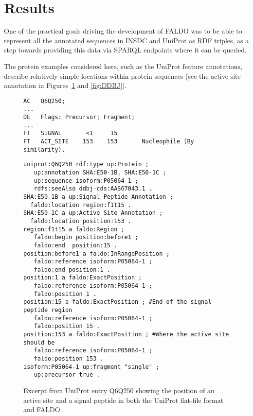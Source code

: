 \section*{Results}
One of the practical goals driving the development of FALDO was to be able
to represent all the annotated sequences in INSDC and UniProt as RDF
triples, as a step towards providing this data via SPARQL endpoints where
it can be queried.

The protein examples considered here, such as the UniProt feature annotations,
describe relatively simple locations within protein sequences
(see the active site annotation in Figures~\ref{fig:UniProt} and \ref{fig:DDBJ}).

\begin{figure}
\begin{shaded}
\small
\begin{verbatim}
AC   Q6Q250;
...
DE   Flags: Precursor; Fragment;
...
FT   SIGNAL       <1     15
FT   ACT_SITE    153    153       Nucleophile (By similarity).
\end{verbatim}
\begin{verbatim}
uniprot:Q6Q250 rdf:type up:Protein ;
   up:annotation SHA:E50-1B, SHA:E50-1C ;
   up:sequence isoform:P05064-1 ;
   rdfs:seeAlso ddbj-cds:AAS67043.1 .
SHA:E50-1B a up:Signal_Peptide_Annotation ;
  faldo:location region:f1t15 .
SHA:E50-1C a up:Active_Site_Annotation ;
  faldo:location position:153 .
region:f1t15 a faldo:Region ;
   faldo:begin position:before1 ;
   faldo:end  position:15 .
position:before1 a faldo:InRangePosition ;
   faldo:reference isoform:P05064-1 ;
   faldo:end position:1 . 
position:1 a faldo:ExactPosition ;
   faldo:reference isoform:P05064-1 ;
   faldo:position 1 .
position:15 a faldo:ExactPosition ; #End of the signal peptide region
   faldo:reference isoform:P05064-1 ;
   faldo:position 15 .   
position:153 a faldo:ExactPosition ; #Where the active site should be
   faldo:reference isoform:P05064-1 ;
   faldo:position 153 .
isoform:P05064-1 up:fragment "single" ;
   up:precursor true .
\end{verbatim}
\end{shaded}
\caption{Excerpt from UniProt entry Q6Q250 showing the position of an active site and a signal peptide in both the UniProt flat-file format and FALDO.}
\label{fig:UniProt}
\end{figure}
